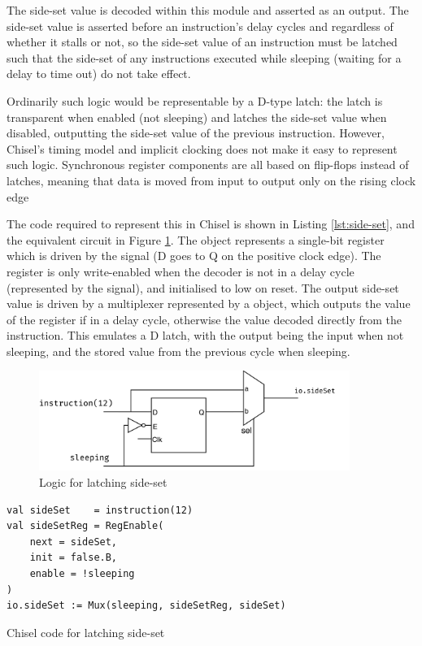 The side-set value is decoded within this module and asserted as an output. The side-set value is asserted before an instruction's delay cycles and regardless of whether it stalls or not, so the side-set value of an instruction must be latched such that the side-set of any  instructions executed while sleeping (waiting for a delay to time out) do not take effect.

Ordinarily such logic would be representable by a D-type latch: the latch is transparent when enabled (not sleeping) and latches the side-set value when disabled, outputting the side-set value of the previous instruction. However, Chisel's timing model and implicit clocking does not make it easy to represent such logic. Synchronous register components are all based on flip-flops instead of latches, meaning that data is moved from input to output only on the rising clock edge

The code required to represent this in Chisel is shown in Listing \ref{lst:side-set}, and the equivalent circuit in Figure \ref{fig:side-set}. The  object represents a single-bit register which is driven by the  signal (D goes to Q on the positive clock edge). The register is only write-enabled when the decoder is not in a delay cycle (represented by the  signal), and initialised to low on reset. The output side-set value  is driven by a multiplexer represented by a  object, which outputs the value of the register if in a delay cycle, otherwise the value decoded directly from the instruction. This emulates a D latch, with the output being the input when not sleeping, and the stored value from the previous cycle when sleeping.

\begin{figure}[H]
    \centering
    \includegraphics[width=0.9\textwidth]{../img/side-set.png}
    \caption{Logic for latching side-set}
    \label{fig:side-set}
\end{figure}

\begin{listing}[h!]
    \vspace{0.5cm}
    \begin{verbatim}
val sideSet    = instruction(12)
val sideSetReg = RegEnable(
    next = sideSet, 
    init = false.B, 
    enable = !sleeping
)
io.sideSet := Mux(sleeping, sideSetReg, sideSet)
    \end{verbatim}
    \caption{Chisel code for latching side-set}
    \label{lst:side-set}
\end{listing}



